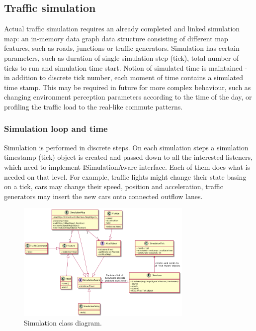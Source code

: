 \subsection{Traffic simulation}
Actual traffic simulation requires an already completed and linked simulation map: an in-memory data graph data structure consisting of different map features, such as roads, junctions or traffic generators. Simulation has certain parameters, such as duration of single simulation step (tick), total number of ticks to run and simulation time start. Notion of simulated time is maintained - in addition to discrete tick number, each moment of time contains a simulated time stamp. This may be required in future for more complex behaviour, such as changing environment perception parameters according to the time of the day, or profiling the traffic load to the real-like commute patterns.

\subsubsection{Simulation loop and time}
Simulation is performed in discrete steps. On each simulation steps a simulation timestamp (tick) object is created and passed down to all the interested listeners, which need to implement ISimulationAware interface. Each of them does what is needed on that level. For example, traffic lights might change their state basing on a tick, cars may change their speed, position and acceleration, traffic generators may insert the new cars onto connected outflow lanes.

\begin{figure}[h]
    \vspace{1.5em}
    \caption{Simulation class diagram.}
    \label{fig:simulationClassDiagram}
    \centering
    \includegraphics[width=0.75\textwidth]{../../uml_diagrams/simulatorClassDiagram.png}
\end{figure}

